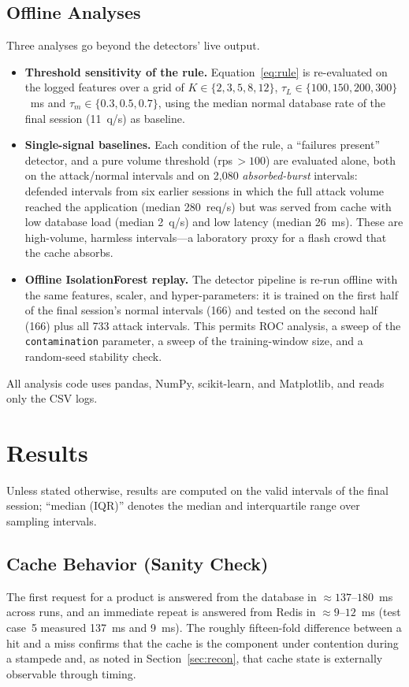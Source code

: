\documentclass[preprint,12pt]{elsarticle}
\begin{document}
\subsection{Offline Analyses}
Three analyses go beyond the detectors' live output.
\begin{itemize}[leftmargin=*]
\item \textbf{Threshold sensitivity of the rule.} Equation~\eqref{eq:rule} is
re-evaluated on the logged features over a grid of $K\in\{2,3,5,8,12\}$,
$\tau_L\in\{100,150,200,300\}$~ms and $\tau_m\in\{0.3,0.5,0.7\}$, using the median
normal database rate of the final session (11~q/s) as baseline.
\item \textbf{Single-signal baselines.} Each condition of the rule, a ``failures
present'' detector, and a pure volume threshold (rps$\,>100$) are evaluated alone, both
on the attack/normal intervals and on 2{,}080 \emph{absorbed-burst} intervals: defended
intervals from six earlier sessions in which the full attack volume reached the
application (median 280~req/s) but was served from cache with low database load
(median 2~q/s) and low latency (median 26~ms). These are high-volume, harmless
intervals---a laboratory proxy for a flash crowd that the cache absorbs.
\item \textbf{Offline IsolationForest replay.} The detector pipeline is re-run offline
with the same features, scaler, and hyper-parameters: it is trained on the first half
of the final session's normal intervals (166) and tested on the second half (166) plus
all 733 attack intervals. This permits ROC analysis, a sweep of the
\texttt{contamination} parameter, a sweep of the training-window size, and a
random-seed stability check.
\end{itemize}
All analysis code uses pandas, NumPy, scikit-learn, and Matplotlib, and reads only the
CSV logs.

\section{Results}
\label{sec:results}

Unless stated otherwise, results are computed on the valid intervals of the final
session; ``median (IQR)'' denotes the median and interquartile range over sampling
intervals.

\subsection{Cache Behavior (Sanity Check)}
\label{sec:sanity}
The first request for a product is answered from the database in ${\approx}137$--$180$~ms
across runs, and an immediate repeat is answered from Redis in ${\approx}9$--$12$~ms
(test case~5 measured 137~ms and 9~ms). The roughly fifteen-fold difference between a
hit and a miss confirms that the cache is the component under contention during a
stampede and, as noted in Section~\ref{sec:recon}, that cache state is externally
observable through timing.
\end{document}
